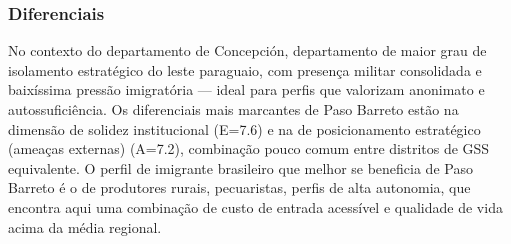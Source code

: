 \subsubsection*{Diferenciais}\label{dif-paso-barreto-0111}
No contexto do departamento de Concepción, departamento de maior grau de isolamento estratégico do leste paraguaio, com presença militar consolidada e baixíssima pressão imigratória — ideal para perfis que valorizam anonimato e autossuficiência. Os diferenciais mais marcantes de Paso Barreto estão na dimensão de solidez institucional (E=7.6) e na de posicionamento estratégico (ameaças externas) (A=7.2), combinação pouco comum entre distritos de GSS equivalente. O perfil de imigrante brasileiro que melhor se beneficia de Paso Barreto é o de produtores rurais, pecuaristas, perfis de alta autonomia, que encontra aqui uma combinação de custo de entrada acessível e qualidade de vida acima da média regional.
